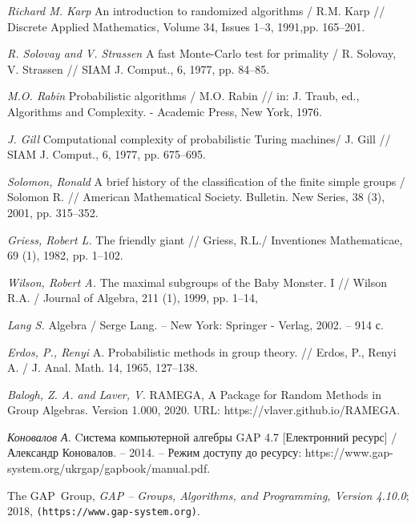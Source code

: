 \newpage
{}
\renewcommand{\bibname}{\centerline{\bf Список використаної літератури}}

\renewcommand{\refname}{\centerline{\bf Список використаної літератури}}
\begin{thebibliography}{999}\label{bib}


{\it Richard M. Karp} An introduction to randomized algorithms / R.M. Karp // 
Discrete Applied Mathematics, Volume 34, Issues 1–3, 1991,pp. 165--201.

 {\it R. Solovay and V. Strassen} A fast Monte-Carlo test for primality / R. Solovay, V. Strassen // SIAM J. Comput., 6, 1977, pp. 84--85.


 {\it M.O. Rabin} Probabilistic algorithms / M.O. Rabin // in: J. Traub, ed., Algorithms and Complexity. - Academic Press, New York, 1976.


 {\it J. Gill} Computational complexity of probabilistic Turing machines/ J. Gill // SIAM J. Comput., 6, 1977, pp. 675--695.

 {\it Solomon, Ronald} A brief history of the classification of the finite simple groups / Solomon R. // American Mathematical Society. Bulletin. New Series, 38 (3), 2001, pp. 315--352. 

{\it Griess, Robert L.} The friendly giant // Griess, R.L./ Inventiones Mathematicae, 69 (1), 1982, pp. 1--102. 

{\it Wilson, Robert A.} The maximal subgroups of the Baby Monster. I // Wilson R.A. / Journal of Algebra, 211 (1), 1999, pp. 1--14,

{\it Lang S.} Algebra / Serge Lang. – New York: Springer - Verlag, 2002. – 914 с. 

{\it Erdos, P., Renyi} A. Probabilistic methods in group theory. // Erdos, P., Renyi A. / J. Anal. Math. 14, 1965, 127--138. 

{\it Balogh, Z. A. and Laver, V.} RAMEGA, A Package for Random Methods in Group Algebras. Version 1.000, 2020. URL: https://vlaver.github.io/RAMEGA. 

{\it Коновалов А.} Cистема компьютерной алгебры GAP 4.7 [Електронний ресурс] / Александр Коновалов. – 2014. – Режим доступу до ресурсу: https://www.gap-system.org/ukrgap/gapbook/manual.pdf.



  The GAP~Group, \emph{GAP -- Groups, Algorithms, and Programming, 
  Version 4.10.0}; 
  2018,
  \verb+(https://www.gap-system.org)+.

\end{thebibliography}



